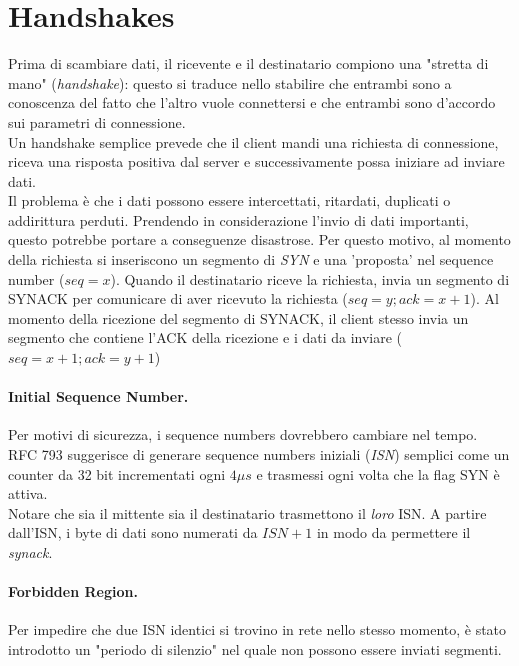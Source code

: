 \section{Handshakes}
Prima di scambiare dati, il ricevente e il destinatario compiono una "stretta di mano" (\textit{handshake}):
questo si traduce nello stabilire che entrambi sono a conoscenza del fatto che l'altro vuole connettersi e che entrambi sono d'accordo sui parametri di connessione.\\
Un handshake semplice prevede che il client mandi una richiesta di connessione, riceva una risposta positiva dal server e successivamente possa iniziare ad inviare dati.\\
Il problema è che i dati possono essere intercettati, ritardati, duplicati o addirittura perduti. Prendendo in considerazione l'invio di dati importanti, questo potrebbe portare a conseguenze disastrose.
Per questo motivo, al momento della richiesta si inseriscono un segmento di \textit{SYN} e una 'proposta' nel sequence number ($ seq = x $). Quando il destinatario riceve la richiesta, invia un segmento di SYNACK per comunicare di aver ricevuto la richiesta ($ seq = y; ack = x+1 $). Al momento della ricezione del segmento di SYNACK, il client stesso invia un segmento che contiene l'ACK della ricezione e i dati da inviare ($ seq = x+1; ack = y+1 $)

\paragraph{Initial Sequence Number.}
Per motivi di sicurezza, i sequence numbers dovrebbero cambiare nel tempo. \\
RFC 793 suggerisce di generare sequence numbers iniziali (\textit{ISN}) semplici come un counter da 32 bit incrementati ogni $ 4 \mu s $ e trasmessi ogni volta che la flag SYN è attiva. \\
Notare che sia il mittente sia il destinatario trasmettono il \textit{loro} ISN. %
A partire dall'ISN, i byte di dati sono numerati da $ ISN+1 $ in modo da permettere il \textit{synack}.

\paragraph{Forbidden Region.} Per impedire che due ISN identici si trovino in rete nello stesso momento, è stato introdotto un "periodo di silenzio" nel quale non possono essere inviati segmenti. %

